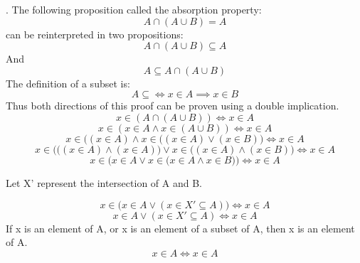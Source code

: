 \documentclass[11pt]{article}
\begin{document}
\begin{enumerate}
.
\newline The following proposition called the absorption property:
\begin{equation}
    A \cap (A \cup B) = A 
\end{equation}
 can be reinterpreted in two propositions:
\begin{equation}
     A \cap ( A \cup B) \subseteq  A     
\end{equation}
And 
\begin{equation}
     A \subseteq A \cap ( A \cup B) 
\end{equation}
The definition of a subset is:
\begin{equation}
    A \subseteq \iff x \in A \implies x \in B
\end{equation}
Thus both directions of this proof can be proven using a double implication.
\begin{equation}
     x \in (A \cap(A\cup B) )\iff x \in A 
\end{equation}
\begin{equation}
    x \in (x \in A \land x \in (A \cup B))\iff x \in A
\end{equation}
\begin{equation}
    x \in \bigg( (x \in A) \land x \in \Big((x \in A) \lor (x \in B )\bigg)\iff x \in A
\end{equation}
\begin{equation}
        x \in \bigg( \big( (x \in A) \land  (x \in A) \big) \lor  x \in \Big((x \in A) \land (x \in B )\bigg)\iff x \in A
\end{equation}
\begin{equation}
    x \in \bigg( x \in A \lor x \in \Big( x \in A \land x \in B \Big) \bigg) \iff x \in A 
\end{equation}

 Let X' represent the intersection of A and B. 
 
\begin{equation}
        x \in \bigg( x \in A \lor  (x \in X' \subseteq A )  \bigg) \iff x \in A 
\end{equation}
 \begin{equation}
        x \in A \lor  (x \in X' \subseteq A )  \iff x \in A 
\end{equation}
If x is an element of A, or x is an element of a subset of A, then x is an element of A. 
\begin{equation}
    x \in A \iff x \in A
\end{equation}



\end{enumerate}
\end{document}

